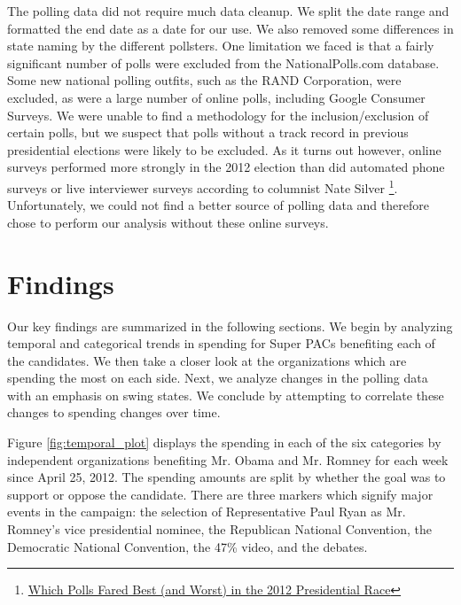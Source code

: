 \documentclass[11pt]{article}\usepackage{graphicx, color}
\begin{document}
The polling data did not require much data cleanup. We split the date range and formatted the end date as a date for our use. We also removed some differences in state naming by the different pollsters.  One limitation we faced is that a fairly significant number of polls were excluded from the NationalPolls.com database.  Some new national polling outfits, such as the RAND Corporation, were excluded, as were a large number of online polls, including Google Consumer Surveys.  We were unable to find a methodology for the inclusion/exclusion of certain polls, but we suspect that polls without a track record in previous presidential elections were likely to be excluded.  As it turns out however, online surveys performed more strongly in the 2012 election than did automated phone surveys or live interviewer surveys according to columnist Nate Silver \footnote{\href{http://fivethirtyeight.blogs.nytimes.com/2012/11/10/which-polls-fared-best-and-worst-in-the-2012-presidential-race/}{Which Polls Fared Best (and Worst) in the 2012 Presidential Race}}. Unfortunately, we could not find a better source of polling data and therefore chose to perform our analysis without these online surveys.


\section{Findings}
Our key findings are summarized in the following sections.  We begin by analyzing temporal and categorical trends in spending for Super PACs benefiting each of the candidates. We then take a closer look at the organizations which are spending the most on each side. Next, we analyze changes in the polling data with an emphasis on swing states. We conclude by attempting to correlate these changes to spending changes over time.

Figure \ref{fig:temporal_plot} displays the spending in each of the six categories by independent organizations benefiting Mr. Obama and Mr. Romney for each week since April 25, 2012. The spending amounts are split by whether the goal was to support or oppose the candidate. There are three markers which signify major events in the campaign: the selection of Representative Paul Ryan as Mr. Romney's vice presidential nominee, the Republican National Convention, the Democratic National Convention, the 47\% video, and the debates.
\end{document}
